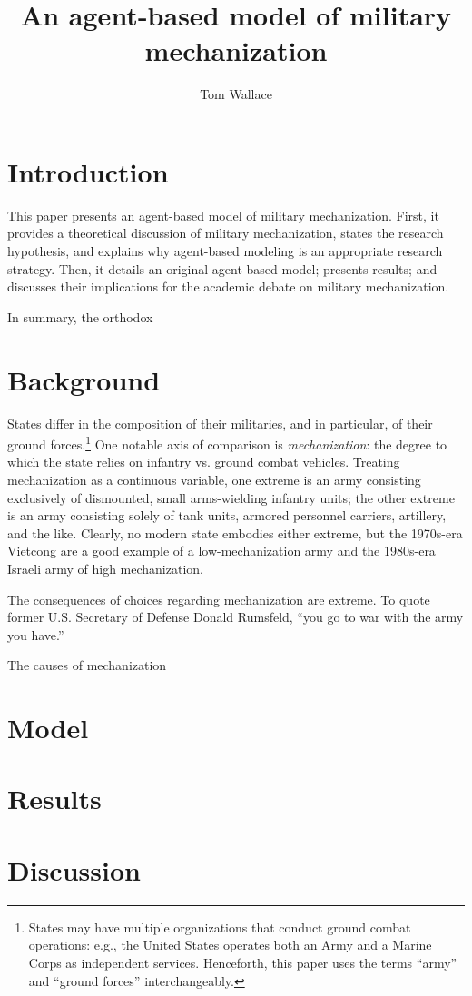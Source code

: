 \documentclass{article}
\title{An agent-based model of military mechanization}
\author{Tom Wallace}
\begin{document}
\maketitle

\section{Introduction}

This paper presents an agent-based model of military mechanization. First, it
provides a theoretical discussion of military mechanization, states the research
hypothesis, and explains why agent-based modeling is an appropriate research strategy.
Then, it details an original agent-based model; presents results; and discusses
their implications for the academic debate on military mechanization.

In summary, the orthodox 

\section{Background}

States differ in the composition of their militaries, and in particular, of
their ground forces.\footnote{States may have multiple organizations that
conduct ground combat operations: e.g., the United States operates both an Army
and a Marine Corps as independent services. Henceforth, this paper uses the
terms ``army'' and ``ground forces'' interchangeably.} One notable axis of comparison 
is \textit{mechanization}: the degree to which the state relies on infantry 
vs. ground combat vehicles. Treating mechanization as a continuous variable, 
one extreme is an army consisting exclusively of dismounted, small 
arms-wielding infantry units; the other extreme is an army consisting 
solely of tank units, armored personnel carriers, artillery, and the like.
Clearly, no modern state embodies either extreme, but the 1970s-era Vietcong are
a good example of a low-mechanization army and the 1980s-era Israeli army of
high mechanization.

The consequences of choices regarding mechanization are extreme. To quote former
U.S. Secretary of Defense Donald Rumsfeld, ``you go to war with the army you
have.''

The causes of mechanization 

\cite{sechser2010army}
\cite{biddle2004military}
\cite{gartzke2001democracy}
\cite{farrell2001transitional}

\section{Model}

\section{Results}

\section{Discussion}
\printbibliography[heading=bibnumbered]
\end{document}
